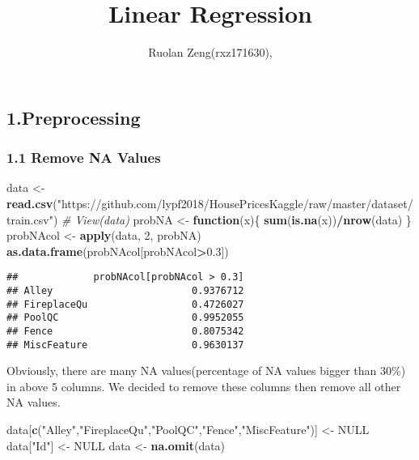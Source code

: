 \documentclass[]{article}
\title{Linear Regression}
\author{Ruolan Zeng(rxz171630),}
\date{}
\newenvironment{Shaded}{\begin{snugshade}}{\end{snugshade}}
\newcommand{\KeywordTok}[1]{\textcolor[rgb]{0.13,0.29,0.53}{\textbf{#1}}}
\newcommand{\DecValTok}[1]{\textcolor[rgb]{0.00,0.00,0.81}{#1}}
\newcommand{\FloatTok}[1]{\textcolor[rgb]{0.00,0.00,0.81}{#1}}
\newcommand{\StringTok}[1]{\textcolor[rgb]{0.31,0.60,0.02}{#1}}
\newcommand{\CommentTok}[1]{\textcolor[rgb]{0.56,0.35,0.01}{\textit{#1}}}
\newcommand{\OtherTok}[1]{\textcolor[rgb]{0.56,0.35,0.01}{#1}}
\newcommand{\ControlFlowTok}[1]{\textcolor[rgb]{0.13,0.29,0.53}{\textbf{#1}}}
\newcommand{\OperatorTok}[1]{\textcolor[rgb]{0.81,0.36,0.00}{\textbf{#1}}}
\newcommand{\NormalTok}[1]{#1}
\begin{document}
\maketitle

\subsection{1.Preprocessing}\label{preprocessing}

\subsubsection{1.1 Remove NA Values}\label{remove-na-values}

\begin{Shaded}
\begin{Highlighting}[]
\NormalTok{data <-}\StringTok{ }\KeywordTok{read.csv}\NormalTok{(}\StringTok{"https://github.com/lypf2018/HousePricesKaggle/raw/master/dataset/train.csv"}\NormalTok{)}
\CommentTok{# View(data)}
\NormalTok{probNA <-}\StringTok{ }\ControlFlowTok{function}\NormalTok{(x)\{}
  \KeywordTok{sum}\NormalTok{(}\KeywordTok{is.na}\NormalTok{(x))}\OperatorTok{/}\KeywordTok{nrow}\NormalTok{(data)}
\NormalTok{\}}
\NormalTok{probNAcol <-}\StringTok{ }\KeywordTok{apply}\NormalTok{(data, }\DecValTok{2}\NormalTok{, probNA)}
\KeywordTok{as.data.frame}\NormalTok{(probNAcol[probNAcol}\OperatorTok{>}\FloatTok{0.3}\NormalTok{])}
\end{Highlighting}
\end{Shaded}

\begin{verbatim}
##             probNAcol[probNAcol > 0.3]
## Alley                        0.9376712
## FireplaceQu                  0.4726027
## PoolQC                       0.9952055
## Fence                        0.8075342
## MiscFeature                  0.9630137
\end{verbatim}

Obviously, there are many NA values(percentage of NA values bigger than
30\%) in above 5 columns. We decided to remove these columns then remove
all other NA values.

\begin{Shaded}
\begin{Highlighting}[]
\NormalTok{data[}\KeywordTok{c}\NormalTok{(}\StringTok{"Alley"}\NormalTok{,}\StringTok{"FireplaceQu"}\NormalTok{,}\StringTok{"PoolQC"}\NormalTok{,}\StringTok{"Fence"}\NormalTok{,}\StringTok{"MiscFeature"}\NormalTok{)] <-}\StringTok{ }\OtherTok{NULL}
\NormalTok{data[}\StringTok{"Id"}\NormalTok{] <-}\StringTok{ }\OtherTok{NULL}
\NormalTok{data <-}\StringTok{ }\KeywordTok{na.omit}\NormalTok{(data)}
\end{Highlighting}
\end{Shaded}
\end{document}
